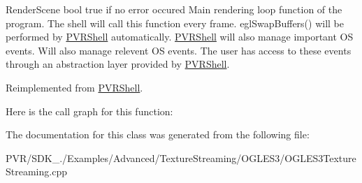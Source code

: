   Render\+Scene  bool true if no error occured  Main rendering loop function of the program. The shell will call this function every frame. egl\+Swap\+Buffers() will be performed by \hyperlink{class_p_v_r_shell}{P\+V\+R\+Shell} automatically. \hyperlink{class_p_v_r_shell}{P\+V\+R\+Shell} will also manage important O\+S events. Will also manage relevent O\+S events. The user has access to these events through an abstraction layer provided by \hyperlink{class_p_v_r_shell}{P\+V\+R\+Shell}. 

Reimplemented from \hyperlink{class_p_v_r_shell_ae0eb5f797cbe993a22b8659f9c332578}{P\+V\+R\+Shell}.



Here is the call graph for this function\+:




The documentation for this class was generated from the following file\+:\begin{DoxyCompactItemize}
\item 
P\+V\+R/\+S\+D\+K\+\_./\+Examples/\+Advanced/\+Texture\+Streaming/\+O\+G\+L\+E\+S3/O\+G\+L\+E\+S3\+Texture\+Streaming.\+cpp\end{DoxyCompactItemize}
